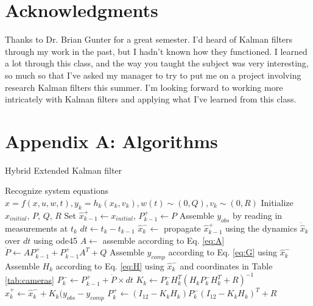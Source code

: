 \documentclass[letterpaper, paper,11pt]{AAS}	%
\begin{document}
\pagebreak
\section{Acknowledgments}

Thanks to Dr. Brian Gunter for a great semester. I'd heard of Kalman filters through my work in the past, but I hadn't known how they functioned. I learned a lot through this class, and the way you taught the subject was very interesting, so much so that I've asked my manager to try to put me on a project involving research Kalman filters this summer. I'm looking forward to working more intricately with Kalman filters and applying what I've learned from this class.



\pagebreak
\appendix
\section*{Appendix A: Algorithms}
\begin{algorithm}[H]
\footnotesize
\caption{Hybrid Extended Kalman filter}
\label{alg:EKF}
\begin{algorithmic}[1]
\State Recognize system equations $\hat{x}=f(x,u,w,t), y_k=h_k(x_k,v_k), w(t)\sim(0,Q), v_k\sim(0,R)$
\State Initialize $x_{initial}$, $P$, $Q$, $R$
\State Set $\hat{x}_{k-1}^+ \gets x_{initial}$, $P_{k-1}^+ \gets P$
    \State Assemble $y_{obs}$ by reading in measurements at $t_k$
    \State $dt \gets t_k - t_{k-1}$
    \State $\hat{x}_k^- \gets$ propagate $\hat{x}_{k-1}^+$ using the dynamics $\dot{\hat{x}}_k$ over $dt$ using ode45
    \State $A \gets$ assemble according to Eq. \ref{eq:A}
    \State $\dot{P} \gets AP_{k-1}^+ + P_{k-1}^+A^T + Q$
    \State Assemble $y_{comp}$ according to Eq. \ref{eq:G} using $\hat{x}_k^-$
    \State Assemble $H_k$ according to Eq. \ref{eq:H} using $\hat{x}_k^-$ and coordinates in Table \ref{tab:cameras}
    \State $P_k^- \gets P_{k-1}^+ + \dot{P}\times dt$
    \State $K_k \gets P_k^- H_k^T(H_kP_k^-H_k^T+R)^{-1}$
    \State $\hat{x}_k^+ \gets \hat{x}_k^- + K_k(y_{obs}-y_{comp}$
    \State $P_k^+\gets (I_{12}-K_kH_k)P_k^-(I_{12}-K_kH_k)^T + R$
\EndFor
\end{algorithmic}
\end{algorithm}
\end{document}
